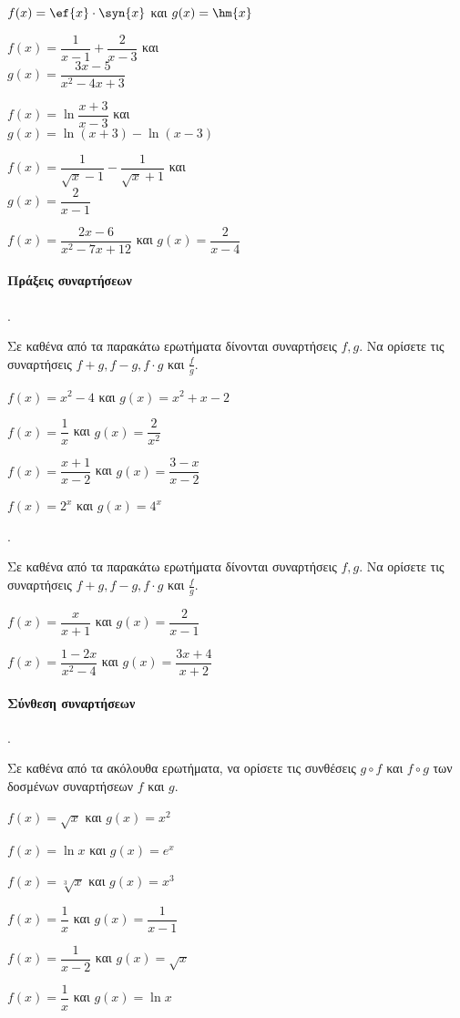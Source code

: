 \documentclass[11pt,a4paper,twocolumn]{article}
\newcounter{askhsh}
\newcommand{\askhsh}{{\large\theaskhsh.}\ \addtocounter{askhsh}{1}}
\begin{document}
\begin{alist}
\item $f(x)=\ef{x}\cdot\syn{x}$ και $g(x)=\hm{x}$
\item $f(x)=\dfrac{1}{x-1}+\dfrac{2}{x-3}$ και\\$g(x)=\dfrac{3x-5}{x^2-4x+3}$
\item $f(x)=\ln{\dfrac{x+3}{x-3}}$ και\\$g(x)=\ln{(x+3)}-\ln{(x-3)}$
\item $f(x)=\dfrac{1}{\sqrt{x}-1}-\dfrac{1}{\sqrt{x}+1}$ και\\
$g(x)=\dfrac{2}{x-1}$
\item $f(x)=\dfrac{2x-6}{x^2-7x+12}$ και $g(x)=\dfrac{2}{x-4}$
\end{alist}
\paragraph{Πράξεις συναρτήσεων}
\askhsh Σε καθένα από τα παρακάτω ερωτήματα δίνονται συναρτήσεις $f,g$. Να ορίσετε τις συναρτήσεις $f+g,f-g,f\cdot g$ και $\frac{f}{g}$.
\begin{alist}
\item $f(x)=x^2-4$ και $g(x)=x^2+x-2$
\item $f(x)=\dfrac{1}{x}$ και $g(x)=\dfrac{2}{x^2}$
\item $f(x)=\dfrac{x+1}{x-2}$ και $g(x)=\dfrac{3-x}{x-2}$
\item $f(x)=2^x$ και $g(x)=4^x$
\end{alist}
\askhsh Σε καθένα από τα παρακάτω ερωτήματα δίνονται συναρτήσεις $f,g$. Να ορίσετε τις συναρτήσεις $f+g,f-g,f\cdot g$ και $\frac{f}{g}$.
\begin{alist}
\item $f(x)=\dfrac{x}{x+1}$ και $g(x)=\dfrac{2}{x-1}$
\item $f(x)=\dfrac{1-2x}{x^2-4}$ και $g(x)=\dfrac{3x+4}{x+2}$
\end{alist}
\paragraph{Σύνθεση συναρτήσεων}
\askhsh Σε καθένα από τα ακόλουθα ερωτήματα, να ορίσετε τις συνθέσεις $g\circ f$ και $f\circ g$ των δοσμένων συναρτήσεων $f$ και $g$.
\begin{alist}
\item $f(x)=\sqrt{x}$ και $g(x)=x^2$
\item $f(x)=\ln{x}$ και $g(x)=e^x$
\item $f(x)=\sqrt[3]{x}$ και $g(x)=x^3$
\item $f(x)=\dfrac{1}{x}$ και $g(x)=\dfrac{1}{x-1}$
\item $f(x)=\dfrac{1}{x-2}$ και $g(x)=\sqrt{x}$
\item $f(x)=\dfrac{1}{x}$ και $g(x)=\ln{x}$
\end{alist}
\end{document}
